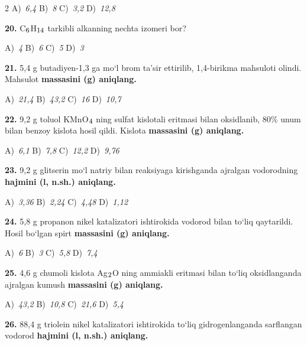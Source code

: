 \documentclass[11pt,a4paper]{article}
\renewcommand{\textsubscript}[1]{\ensuremath{_{\text{\fontsize{8}{8}\selectfont #1}}}}
\begin{document}
\begin{multicols}{2}
\noindent A)~\textsl{6,4} \hfill B)~\textsl{8} \hfill C)~\textsl{3,2} \hfill D)~\textsl{12,8}\par
\vspace{4pt}
\noindent\textbf{20.} C\textsubscript{6}H\textsubscript{14} tarkibli alkanning nechta izomeri bor?

\noindent A)~\textsl{4} \hfill B)~\textsl{6} \hfill C)~\textsl{5} \hfill D)~\textsl{3}\par
\vspace{4pt}
\noindent\textbf{21.} 5,4 g butadiyen-1,3 ga mo`l brom ta'sir ettirilib, 1,4-birikma mahsuloti olindi. Mahsulot \textbf{massasini (g) aniqlang.}

\noindent A)~\textsl{21,4} \hfill B)~\textsl{43,2} \hfill C)~\textsl{16} \hfill D)~\textsl{10,7}\par
\vspace{4pt}
\noindent\textbf{22.} 9,2 g toluol KMnO\textsubscript{4} ning sulfat kislotali eritmasi bilan oksidlanib, 80\% unum bilan benzoy kislota hosil qildi. Kislota \textbf{massasini (g) aniqlang.}

\noindent A)~\textsl{6,1} \hfill B)~\textsl{7,8} \hfill C)~\textsl{12,2} \hfill D)~\textsl{9,76}\par
\vspace{4pt}
\noindent\textbf{23.} 9,2 g glitserin mo`l natriy bilan reaksiyaga kirishganda ajralgan vodorodning \textbf{hajmini (l, n.sh.) aniqlang.}

\noindent A)~\textsl{3,36} \hfill B)~\textsl{2,24} \hfill C)~\textsl{4,48} \hfill D)~\textsl{1,12}\par
\vspace{4pt}
\noindent\textbf{24.} 5,8 g propanon nikel katalizatori ishtirokida vodorod bilan to`liq qaytarildi. Hosil bo`lgan spirt \textbf{massasini (g) aniqlang.}

\noindent A)~\textsl{6} \hfill B)~\textsl{3} \hfill C)~\textsl{5,8} \hfill D)~\textsl{7,4}\par
\vspace{4pt}
\noindent\textbf{25.} 4,6 g chumoli kislota Ag\textsubscript{2}O ning ammiakli eritmasi bilan to`liq oksidlanganda ajralgan kumush \textbf{massasini (g) aniqlang.}

\noindent A)~\textsl{43,2} \hfill B)~\textsl{10,8} \hfill C)~\textsl{21,6} \hfill D)~\textsl{5,4}\par
\vspace{4pt}
\noindent\textbf{26.} 88,4 g triolein nikel katalizatori ishtirokida to`liq gidrogenlanganda sarflangan vodorod \textbf{hajmini (l, n.sh.) aniqlang.}


\end{multicols}
\end{document}
